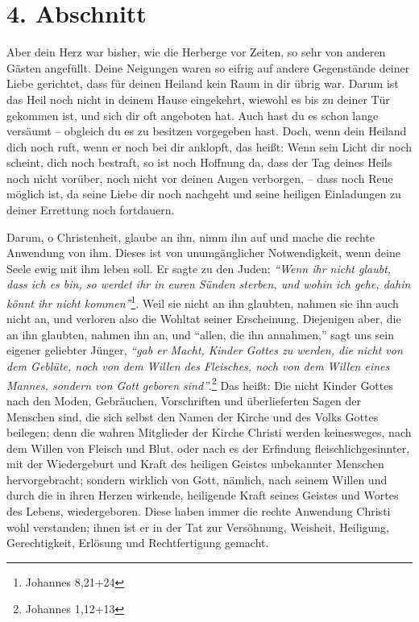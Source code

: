 \section{4. Abschnitt}  \label{kap2_ab4}

Aber dein Herz war bisher, wie die Herberge vor Zeiten, so sehr von anderen
Gästen angefüllt. Deine Neigungen waren so eifrig auf andere Gegenstände deiner
Liebe gerichtet, dass für deinen Heiland kein Raum in dir übrig war. Darum ist
das Heil noch nicht in deinem Hause eingekehrt, wiewohl es bis zu deiner Tür
gekommen ist, und sich dir oft angeboten hat. Auch hast du es schon lange
versäumt -- obgleich du es zu besitzen vorgegeben hast. Doch, wenn dein Heiland
dich noch ruft, wenn er noch bei dir anklopft, das heißt: Wenn sein Licht dir
noch scheint, dich noch bestraft, so ist noch Hoffnung da, dass der Tag deines
Heils noch nicht vorüber, noch nicht vor deinen Augen verborgen, -- dass noch
Reue
möglich ist, da seine Liebe dir noch nachgeht und seine heiligen Einladungen
zu deiner Errettung noch fortdauern.

Darum, o Christenheit, glaube an ihn, nimm ihn auf und mache die rechte
Anwendung von ihm. Dieses ist von unumgänglicher Notwendigkeit, wenn deine
Seele ewig mit ihm leben soll.
Er sagte zu den Juden:
\textit{"`Wenn ihr nicht glaubt, dass ich es bin, so werdet ihr in euren Sünden
sterben, und wohin ich gehe, dahin könnt ihr nicht kommen"'}\footnote{Johannes
8,21+24}.
 Weil sie nicht an ihn
glaubten, nahmen sie ihn auch nicht an, und verloren also die Wohltat seiner
Erscheinung. Diejenigen aber, die an ihn glaubten, nahmen ihn an, und "`allen,
die ihn annahmen,"' sagt uns sein eigener geliebter Jünger,
\textit{"`gab er Macht, Kinder Gottes zu werden, die nicht von dem Geblüte, noch
von dem Willen des Fleisches, noch von dem Willen eines Mannes, sondern von Gott
geboren sind"'}.\footnote{Johannes 1,12+13}
Das heißt: Die nicht Kinder Gottes nach den
Moden, Gebräuchen, Vorschriften und überlieferten Sagen der Menschen sind, die
sich selbst den Namen der Kirche und des Volks Gottes beilegen; denn die wahren
Mitglieder der Kirche Christi werden keinesweges, nach dem Willen von Fleisch
und Blut, oder nach es der Erfindung fleischlichgesinnter, mit der Wiedergeburt
und Kraft des heiligen Geistes unbekannter Menschen hervorgebracht; sondern
wirklich von Gott, nämlich, nach seinem Willen und durch die in ihren Herzen
wirkende, heiligende Kraft seines Geistes und Wortes des Lebens, wiedergeboren.
Diese haben immer die rechte Anwendung Christi wohl verstanden; ihnen ist er in
der Tat zur Versöhnung, Weisheit, Heiligung, Gerechtigkeit, Erlösung und
Rechtfertigung gemacht.

